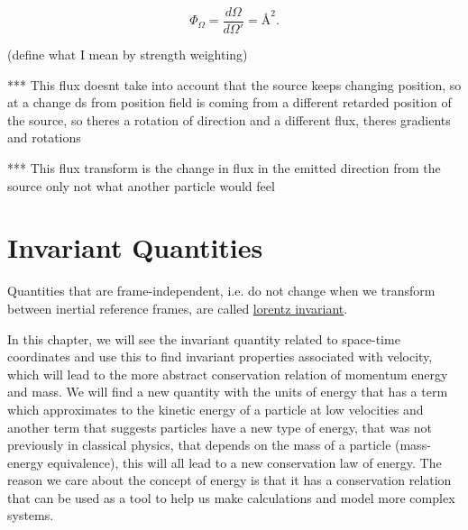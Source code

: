 \begin{equation}
	\label{eq: aberrational wavefront weighting}
	\Phi_\Omega = \frac{d\Omega}{d\Omega'} = \text{\AA}^2.
\end{equation}

(define what I mean by strength weighting)

*** This flux doesnt take into account that the source keeps changing position, so at a change ds from position field is coming from a different retarded position of the source, so theres a rotation of direction and a different flux, theres gradients and rotations

*** This flux transform is the change in flux in the emitted direction from the source only not what another particle would feel



\chapter{Invariant Quantities}

Quantities that are frame-independent, i.e. do not change when we transform between inertial reference frames, are called \hyperlink{def-lorentz-invariant}{lorentz invariant}.

In this chapter, we will see the invariant quantity related to space-time coordinates and use this to find invariant properties associated with velocity, which will lead to the more abstract conservation relation of momentum energy and mass. We will find a new quantity with the units of energy that has a term which approximates to the kinetic energy of a particle at low velocities and another term that suggests particles have a new type of energy, that was not previously in classical physics, that depends on the mass of a particle (mass-energy equivalence), this will all lead to a new conservation law of energy.  The reason we care about the concept of energy is that it has a conservation relation that can be used as a tool to help us make calculations and model more complex systems.

